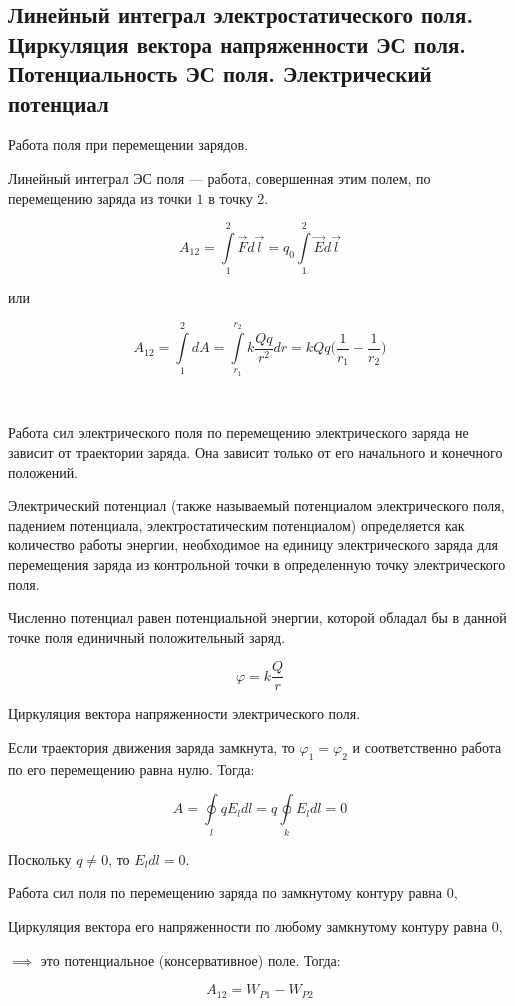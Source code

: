\subsection{Линейный интеграл электростатического поля. Циркуляция вектора напряженности ЭС поля. Потенциальность ЭС поля. Электрический потенциал}

\begin{definition}
    Работа поля при перемещении зарядов.

    Линейный интеграл ЭС поля — работа, совершенная этим полем, по перемещению заряда из точки $1$ в точку $2$.

    $$A_{12}=\int\limits_1^2\vec Fd\vec l=q_0\int\limits_1^2\vec Ed\vec l$$

    или

    $$A_{12}=\int\limits_1^2dA=\int\limits_{r_1}^{r_2}k\frac{Qq}{r^2}dr=kQq\bigg(\frac{1}{r_1}-\frac{1}{r_2}\bigg)$$
\end{definition}\

Работа сил электрического поля по перемещению электрического заряда не зависит от траектории заряда. Она зависит только от его начального и конечного положений.

\begin{definition}
    Электрический потенциал (также называемый потенциалом электрического поля, падением потенциала, электростатическим потенциалом) 
    определяется как количество работы энергии, необходимое на единицу электрического заряда для перемещения заряда из контрольной 
    точки в определенную точку электрического поля.

    Численно потенциал равен потенциальной энергии, которой обладал бы в данной точке поля единичный положительный заряд.

    $$\varphi=k\frac{Q}{r}$$
\end{definition}

\begin{definition}
    Циркуляция вектора напряженности электрического поля.

    Если траектория движения заряда замкнута, то $\varphi_1=\varphi_2$ и соответственно работа по его перемещению равна нулю. Тогда:

    $$A=\oint\limits_lqE_ldl=q\oint\limits_kE_ldl=0$$

    Поскольку $q\ne0$, то $E_ldl=0$.
\end{definition}

Работа сил поля по перемещению заряда по замкнутому контуру равна 0,

Циркуляция вектора его напряженности по любому замкнутому контуру равна 0,

$\implies$ это потенциальное (консервативное) поле. Тогда:

$$A_{12}=W_{P1}-W_{P2}$$